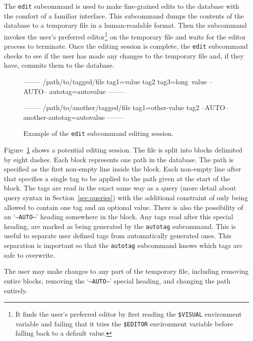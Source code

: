 The \texttt{edit} subcommand is used to make fine-grained edits to the database
with the comfort of a familiar interface. This subcommand dumps the contents of
the database to a temporary file in a human-readable format. Then the
subcommand invokes the user's preferred editor\footnote{It finds the user's
preferred editor by first reading the \texttt{\$VISUAL} environment variable and
failing that it tries the \texttt{\$EDITOR} environment variable before falling
back to a default value.} on the temporary file and waits for the editor
process to terminate. Once the editing session is complete, the \texttt{edit}
subcommand checks to see if the user has made any changes to the temporary
file and, if they have, commits them to the database.

\begin{figure}[h]
    \centering
    \begin{boxedverbatim}


--------
/path/to/tagged/file
tag1=value
tag2
tag3=long\ value
--AUTO--
autotag=autovalue
--------

--------
/path/to/another/tagged/file
tag1=other-value
tag2
--AUTO--
another-autotag=autovalue
--------
    \end{boxedverbatim}
    \label{fig:edit-subcommand-format}
    \caption{Example of the \texttt{edit} subcommand editing session.}
\end{figure}

Figure~\ref{fig:edit-subcommand-format} shows a potential editing session. The
file is split into blocks delimited by eight dashes. Each block represents one
path in the database. The path is specified as the first non-empty line inside
the block. Each non-empty line after that specifies a single tag to be applied
to the path given at the start of the block. The tags are read in the exact
same way as a query (more detail about query syntax in
Section~\ref{sec:queries}) with the additional constraint of only being
allowed to contain one tag and an optional value. There is also the possibility
of an `\texttt{--AUTO--}' heading somewhere in the block. Any tags read after
this special heading, are marked as being generated by the \texttt{autotag}
subcommand. This is useful to separate user defined tags from automatically
generated ones. This separation is important so that the \texttt{autotag}
subcommand knows which tags are safe to overwrite. 

The user may make changes to any part of the temporary file, including removing
entire blocks, removing the `\texttt{--AUTO--}' special heading, and changing
the path entirely.

